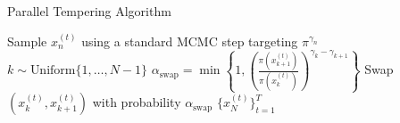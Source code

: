 \documentclass[aspectratio=169]{beamer}
\begin{document}
\begin{frame}{Parallel Tempering Algorithm}
	\begin{algorithm}[H]
		\caption{Parallel Tempering MCMC}
		\begin{algorithmic}[1]
			\STATE Sample $x_n^{(t)}$ using a standard MCMC step targeting $\pi^{\gamma_n}$
			\ENDFOR
			\STATE $k \sim \text{Uniform}\{1, \ldots, N-1\}$
			\STATE $\alpha_{\text{swap}} = \min\left\{1, \left(\frac{\pi(x_{k+1}^{(t)})}{\pi(x_k^{(t)})}\right)^{\gamma_k - \gamma_{k+1}}\right\}$
			\STATE Swap $(x_k^{(t)}, x_{k+1}^{(t)})$ with probability $\alpha_{\text{swap}}$
			\ENDIF
			\ENDFOR
			\RETURN $\{x_N^{(t)}\}_{t=1}^T$

		\end{algorithmic}
	\end{algorithm}


\end{frame}
\end{document}
